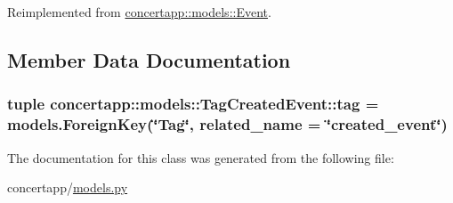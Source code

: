 Reimplemented from \hyperlink{classconcertapp_1_1models_1_1_event_a9a3f3dc074ee05120d953de9845080d0}{concertapp::models::Event}.



\subsection{Member Data Documentation}
\hypertarget{classconcertapp_1_1models_1_1_tag_created_event_a3ce49544d7c8faf799bc1c37e65870fc}{
\subsubsection[{tag}]{\setlength{\rightskip}{0pt plus 5cm}tuple {\bf concertapp::models::TagCreatedEvent::tag} = models.ForeignKey(\char`\"{}Tag\char`\"{}, related\_\-name = \char`\"{}created\_\-event\char`\"{})}}
\label{classconcertapp_1_1models_1_1_tag_created_event_a3ce49544d7c8faf799bc1c37e65870fc}


The documentation for this class was generated from the following file:\begin{DoxyCompactItemize}
\item 
concertapp/\hyperlink{models_8py}{models.py}\end{DoxyCompactItemize}
